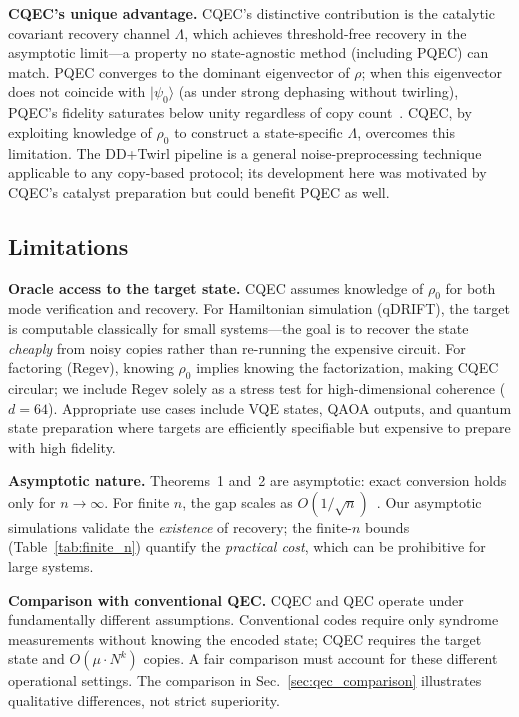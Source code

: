 \documentclass[prx,twocolumn,superscriptaddress,longbibliography,floatfix]{revtex4-2}
\begin{document}
\textbf{CQEC's unique advantage.}
CQEC's distinctive contribution is the catalytic covariant recovery channel $\Lambda$, which achieves threshold-free recovery in the asymptotic limit---a property no state-agnostic method (including PQEC) can match.
PQEC converges to the dominant eigenvector of $\rho$; when this eigenvector does not coincide with $|\psi_0\rangle$ (as under strong dephasing without twirling), PQEC's fidelity saturates below unity regardless of copy count~\cite{Raghoonanan2026}.
CQEC, by exploiting knowledge of $\rho_0$ to construct a state-specific $\Lambda$, overcomes this limitation.
The DD+Twirl pipeline is a general noise-preprocessing technique applicable to any copy-based protocol; its development here was motivated by CQEC's catalyst preparation but could benefit PQEC as well.


\subsection{Limitations}
\label{sec:limitations}

\textbf{Oracle access to the target state.}
CQEC assumes knowledge of $\rho_0$ for both mode verification and recovery.
For Hamiltonian simulation (qDRIFT), the target is computable classically for small systems---the goal is to recover the state \emph{cheaply} from noisy copies rather than re-running the expensive circuit.
For factoring (Regev), knowing $\rho_0$ implies knowing the factorization, making CQEC circular; we include Regev solely as a stress test for high-dimensional coherence ($d = 64$).
Appropriate use cases include VQE states, QAOA outputs, and quantum state preparation where targets are efficiently specifiable but expensive to prepare with high fidelity.

\textbf{Asymptotic nature.}
Theorems~1 and~2 are asymptotic: exact conversion holds only for $n \to \infty$.
For finite $n$, the gap scales as $O(1/\sqrt{n})$~\cite{Shiraishi2024}.
Our asymptotic simulations validate the \emph{existence} of recovery; the finite-$n$ bounds (Table~\ref{tab:finite_n}) quantify the \emph{practical cost}, which can be prohibitive for large systems.

\textbf{Comparison with conventional QEC.}
CQEC and QEC operate under fundamentally different assumptions.
Conventional codes require only syndrome measurements without knowing the encoded state; CQEC requires the target state and $O(\mu \cdot N^k)$ copies.
A fair comparison must account for these different operational settings.
The comparison in Sec.~\ref{sec:qec_comparison} illustrates qualitative differences, not strict superiority.
\end{document}
